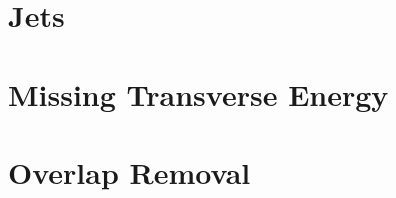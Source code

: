 \documentclass[class=NCU_thesis, crop=false]{standalone}
\begin{document}
\section{Jets}
	
\section{Missing Transverse Energy}
	
\section{Overlap Removal}
\end{document}
